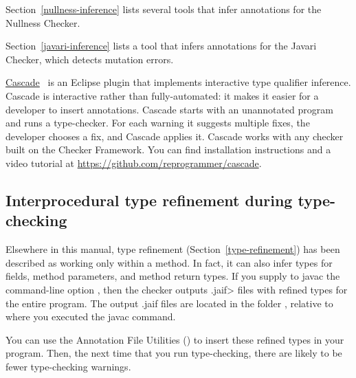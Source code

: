Section~\ref{nullness-inference} lists several tools that infer
annotations for the Nullness Checker.

Section~\ref{javari-inference} lists a tool that infers
annotations for the Javari Checker, which detects mutation errors.

\href{https://github.com/reprogrammer/cascade/}{Cascade}~\cite{VakilianPEJ2014}
is an Eclipse plugin that implements interactive type qualifier inference.
Cascade is interactive rather than fully-automated:  it makes it easier for
a developer to insert annotations.
Cascade starts with an unannotated program and runs a type-checker.  For each
warning it suggests multiple fixes, the developer chooses a fix, and
Cascade applies it.  Cascade works with any checker built on the Checker
Framework.
You can find installation instructions and a video tutorial at \url{https://github.com/reprogrammer/cascade}.


\subsection{Interprocedural type refinement during type-checking\label{jaif-inference}}

Elsewhere in this manual, type refinement (Section~\ref{type-refinement})
has been described as working only within a method.  In fact, it can also
infer types for fields, method parameters, and method return types.  If you
supply to javac the command-line option , then the
checker outputs \<.jaif> files with refined types for the entire program.
The output .jaif files are located in the folder ,
relative to where you executed the javac command.

You can use the Annotation File Utilities
() to
insert these refined types in your program.  Then, the next time that you
run type-checking, there are likely to be fewer type-checking warnings.

